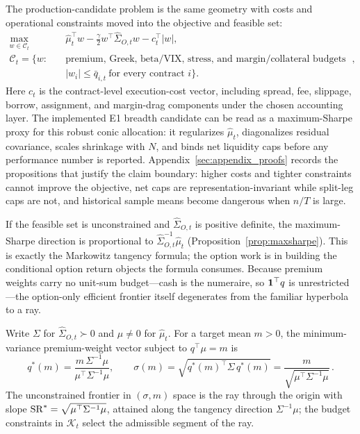 The production-candidate problem is the same geometry with costs and operational
constraints moved into the objective and feasible set:
\[
  \begin{aligned}
  \max_{w\in\mathcal C_t}\quad
  &\widehat\mu_t^\top w
  -\frac{\gamma}{2}w^\top\widehat\Sigma_{O,t}w
  -c_t^\top |w|,\\
  \mathcal C_t=\{w:\quad
  &\text{premium, Greek, beta/VIX, stress, and margin/collateral budgets hold},\\
  &|w_i|\le\bar q_{i,t}\ \text{for every contract }i\}.
  \end{aligned}
\]
Here \(c_t\) is the contract-level execution-cost vector, including spread, fee, slippage,
borrow, assignment, and margin-drag components under the chosen accounting layer. The
implemented E1 breadth candidate can be read as a maximum-Sharpe proxy for this robust
conic allocation: it regularizes \(\widehat\mu_t\), diagonalizes residual covariance,
scales shrinkage with \(N\), and binds net liquidity caps before any performance number is
reported. Appendix~\ref{sec:appendix_proofs} records the propositions that justify the
claim boundary: higher costs and tighter constraints cannot improve the objective, net
caps are representation-invariant while split-leg caps are not, and historical sample
means become dangerous when \(n/T\) is large.

If the feasible set is unconstrained and \(\widehat\Sigma_{O,t}\) is positive definite, the
maximum-Sharpe direction is proportional to \(\widehat\Sigma_{O,t}^{-1}\widehat\mu_t\)
(Proposition~\ref{prop:maxsharpe}). This is exactly the Markowitz tangency formula; the
option work is in building the conditional option return objects the formula consumes.
Because premium weights carry no unit-sum budget---cash is the numeraire, so
\(\mathbf{1}^\top q\) is unrestricted---the option-only efficient frontier itself degenerates
from the familiar hyperbola to a ray.

\begin{proposition}\label{prop:ray}
Write \(\Sigma\) for \(\widehat\Sigma_{O,t}\succ0\) and \(\mu\neq0\) for
\(\widehat\mu_t\). For a target mean \(m>0\), the minimum-variance premium-weight vector
subject to \(q^\top\mu=m\) is
\[
  q^{\ast}(m)=\frac{m\,\Sigma^{-1}\mu}{\mu^\top\Sigma^{-1}\mu},
  \qquad
  \sigma(m)=\sqrt{q^{\ast}(m)^\top\Sigma\,q^{\ast}(m)}
  =\frac{m}{\sqrt{\mu^\top\Sigma^{-1}\mu}}\,.
\]
The unconstrained frontier in \((\sigma,m)\) space is the ray through the origin with slope
\(\operatorname{SR}^{\ast}=\sqrt{\mu^\top\Sigma^{-1}\mu}\), attained along the tangency direction
\(\Sigma^{-1}\mu\); the budget constraints in \(\mathcal K_t\) select the admissible
segment of the ray.
\end{proposition}

